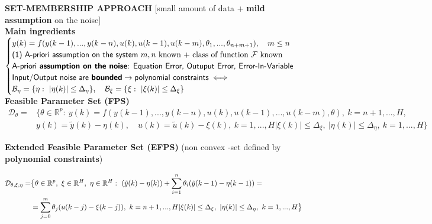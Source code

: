 \documentclass[a4paper, 12pt]{article}
\begin{document}
\noindent
\textbf{\color{blue}SET-MEMBERSHIP APPROACH} [small amount of data + \textbf{mild assumption} on the noise]\\
\textbf{Main ingredients}
$\begin{cases}
     y(k) = f(y(k-1),...,y(k-n), u(k), u(k-1), u(k-m), \theta_1, ..., \theta_{n+m+1}), \quad m \le n\\
    \textsf{(1) A-priori assumption on the system } m,n \text{ known + class of function } \mathcal{F} \ \text{known} \\
    \textsf{A-priori \textbf{assumption on the noise}: Equation Error, Outuput Error, Error-In-Variable}\\
    \textsf{Input/Output noise are \textbf{bounded}} \to \textsf{polynomial constraints} \iff \\
    \mathcal{B}_\eta = \{
                \eta: \ \vert \eta(k) \vert \le \Delta_\eta
            \}, \quad
            \mathcal{B}_\xi = \{
                \xi : \ \vert \xi(k) \vert \le \Delta_\xi
            \} 
    
\end{cases}$        \\

\noindent
\textbf{Feasible Parameter Set (FPS)} \\
\begin{equation*}
    \begin{aligned}
    \mathcal{D}_\theta = &\{
        \theta\in\mathbb{R}^p: \
        y(k)=f(y(k-1), ..., y(k-n), u(k),u(k-1), ..., u(k-m), \theta), \ k=n+1,...,H,\\
        & y(k)=\tilde{y}(k)-\eta(k), \quad 
        u(k)=\tilde{u}(k)-\xi(k), \ k=1, ..., H
        \vert \xi(k) \vert \le \Delta_\xi, \ 
        \vert \eta(k) \vert \le \Delta_\eta, \ 
        k=1,...,H
        \}
\end{aligned}
\end{equation*}

\vspace{0.7em}
\noindent
\textbf{Extended Feasible Parameter Set (EFPS)} {\small{(non convex -set defined by \textbf{polynomial constraints})}}

\begin{equation*}
    \linespread{0.3em}
    \begin{aligned}
        \mathcal{D}_{\theta,\xi,\eta} =&\big\{
            \theta\in\mathbb{R}^p,\ 
            \xi \in \mathbb{R}^H, \
            \eta \in \mathbb{R}^H: \ 
            (\tilde{y}(k)-\eta(k))+ 
            \sum_{i=1}^n {\theta_i (\tilde{y}(k-1)-\eta(k-1))} =\\ &=\sum_{j=0}^m {\theta_j} (u(k-j)-\xi(k-j)), \ k=n+1, ..., H 
            \vert \xi(k) \vert \le \Delta_\xi, \ 
            \vert \eta(k) \vert \le \Delta_\eta, \ 
            k=1,...,H
        \big\}
    \end{aligned}
\end{equation*}
\end{document}
